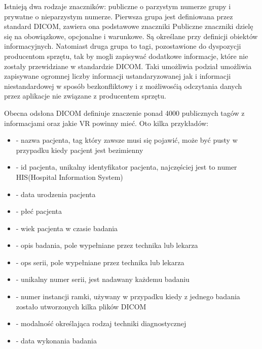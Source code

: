 Istnieją dwa rodzaje znaczników: publiczne o parzystym numerze grupy i prywatne o nieparzystym numerze.
Pierwsza grupa jest definiowana przez standard DICOM, zawiera ona podstawowe znaczniki
Publiczne znaczniki dzielę się na obowiązkowe, opcjonalne i warunkowe.
Są określane przy definicji obiektów informacyjnych.
Natomiast druga grupa to tagi, pozostawione do dyspozycji producentom sprzętu, tak by mogli zapisywać dodatkowe informacje, które nie zostały przewidziane w standardzie DICOM.
Taki umożliwia podział umożliwia zapisywane ogromnej liczby informacji ustandaryzowanej jak i informacji niestandardowej w sposób bezkonfliktowy i z możliwosćią odczytania danych przez aplikacje nie związane z producentem sprzętu.

Obecna odsłona DICOM definiuje znaczenie ponad 4000 publicznych tagów z informacjami oraz jakie VR powinny mieć.
Oto kilka przykładów:
\begin{itemize}
    \item {} - nazwa pacjenta, tag który zawsze musi się pojawić, może być pusty w przypadku kiedy pacjent jest bezimienny

    \item {} - id pacjenta, unikalny identyfikator pacjenta, najczęściej jest to numer HIS(Hospital Information System)

    \item {} - data urodzenia pacjenta

    \item {} - płeć pacjenta

    \item {} - wiek pacjenta w czasie badania

    \item {} - opis badania, pole wypełniane przez technika lub lekarza

    \item {} - ops serii, pole wypełniane przez technika lub lekarza

    \item {} - unikalny numer serii, jest nadawany każdemu badaniu

    \item {} - numer instancji ramki, używany w przypadku kiedy z jednego badania zostało utworzonych kilka plików DICOM

    \item {} - modalność określająca rodzaj techniki diagnostycznej

    \item {} - data wykonania badania
\end{itemize}


